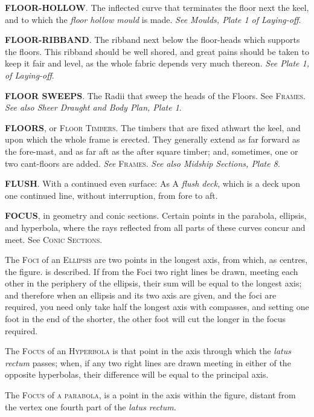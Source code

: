 \textbf{FLOOR-HOLLOW}. The inflected curve that terminates the floor next the keel, and to which the \textit{floor hollow mould} is made. \textit{See Moulds, Plate 1 of Laying-off}. 

\textbf{FLOOR-RIBBAND}. The ribband next below the floor-heads which supports the floors. This ribband should be well shored, and great pains should be taken to keep it fair and level, as the whole fabric depends very much thereon. \textit{See Plate 1, of Laying-off}. 

\textbf{FLOOR SWEEPS}. The Radii that sweep the heads of the Floors. See \textsc{Frames}. \textit{See also Sheer Draught and Body Plan, Plate 1}. 

\textbf{FLOORS}, or \textsc{Floor Timbers}. The timbers that are fixed athwart the keel, and upon which the whole frame is erected. They generally extend as far forward as the fore-mast, and as far aft as the after square timber; and, sometimes, one or two cant-floors are added. \textit{See} \textsc{Frames}. \textit{See also Midship Sections, Plate 8}. 

\textbf{FLUSH}. With a continued even surface: As A \textit{flush deck}, which is a deck upon one continued line, without interruption, from fore to aft.

\textbf{FOCUS}, in geometry and conic sections. Certain points in the parabola, ellipsis, and hyperbola, where the rays reflected from all parts of these curves concur and meet. See \textsc{Conic Sections}. 

The \textsc{Foci} of an \textsc{Ellipsis} are two points in the longest axis, from which, as centres, the figure. is described. If from the Foci two right lines be drawn, meeting each other in the periphery of the ellipsis, their sum will be equal to the longest axis; and therefore when an ellipsis and its two axis are given, and the foci are required, you need only take half the longest axis with compasses, and setting one foot in the end of the shorter, the other foot will cut the longer in the focus required. 

The \textsc{Focus} of an \textsc{Hyperbola} is that point in the axis through which the \textit{latus rectum} passes; when, if any two right lines are drawn meeting in either of the opposite hyperbolas, their difference will be equal to the principal axis. 

The \textsc{Focus} of \textsc{a parabola}, is a point in the axis within the figure, distant from the vertex one fourth part of the \textit{latus rectum}. 

